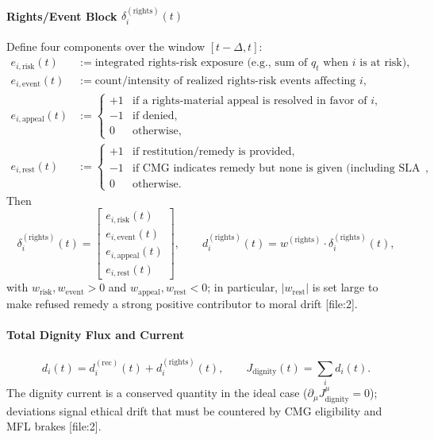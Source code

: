 \documentclass[11pt]{article}
\begin{document}
\paragraph{Rights/Event Block $\delta_i^{(\text{rights})}(t)$}
Define four components over the window $[t-\Delta,t]$:
\begin{align}
  e_{i,\text{risk}}(t) &:= \text{integrated rights‑risk exposure (e.g., sum of $q_t$ when $i$ is at risk)},\\
  e_{i,\text{event}}(t) &:= \text{count/intensity of realized rights‑risk events affecting $i$},\\
  e_{i,\text{appeal}}(t) &:= \begin{cases}
    +1 & \text{if a rights‑material appeal is resolved in favor of $i$},\\
    -1 & \text{if denied},\\
    0 & \text{otherwise},
  \end{cases}\\
  e_{i,\text{rest}}(t) &:= \begin{cases}
    +1 & \text{if restitution/remedy is provided},\\
    -1 & \text{if CMG indicates remedy but none is given (including SLA breaches)},\\
    0 & \text{otherwise}.
  \end{cases}
\end{align}
Then
\begin{equation}
  \delta_i^{(\text{rights})}(t) = \begin{bmatrix}
    e_{i,\text{risk}}(t) \\ e_{i,\text{event}}(t) \\ e_{i,\text{appeal}}(t) \\ e_{i,\text{rest}}(t)
  \end{bmatrix},\qquad
  d_i^{(\text{rights})}(t) = w^{(\text{rights})}\cdot\delta_i^{(\text{rights})}(t),
\end{equation}
with $w_{\text{risk}},w_{\text{event}}>0$ and $w_{\text{appeal}},w_{\text{rest}}<0$; in particular, $|w_{\text{rest}}|$ is set large to make refused remedy a strong positive contributor to moral drift {[file:2]}.

\paragraph{Total Dignity Flux and Current}
\begin{equation}
  d_i(t) = d_i^{(\text{rec})}(t) + d_i^{(\text{rights})}(t),\qquad
  J_{\text{dignity}}(t) = \sum_{i} d_i(t).
\end{equation}
The dignity current is a conserved quantity in the ideal case ($\partial_\mu J^\mu_{\text{dignity}}=0$); deviations signal ethical drift that must be countered by CMG eligibility and MFL brakes {[file:2]}.
\end{document}
